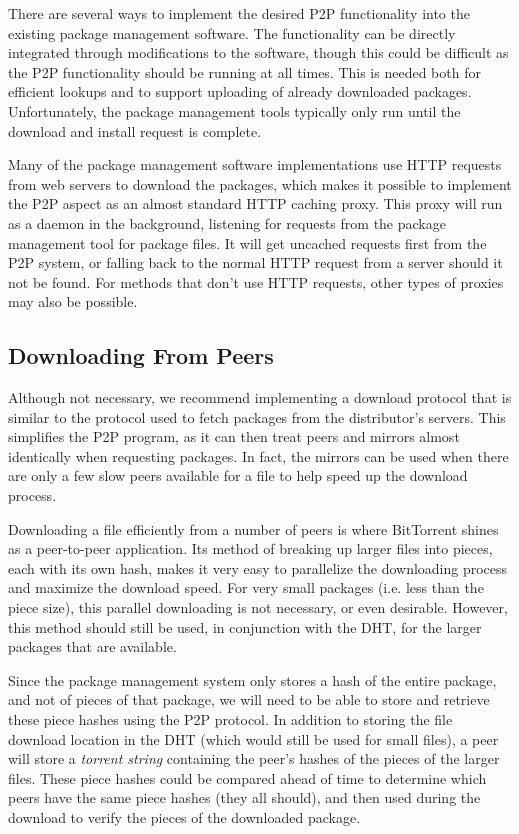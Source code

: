\documentclass[conference]{IEEEtran}
\begin{document}
There are several ways to implement the desired P2P functionality
into the existing package management software. The functionality can
be directly integrated through modifications to the software, though
this could be difficult as the P2P functionality should be running
at all times. This is needed both for efficient lookups and to
support uploading of already downloaded packages. Unfortunately, the
package management tools typically only run until the download and
install request is complete.

Many of the package management software implementations use HTTP
requests from web servers to download the packages, which makes it
possible to implement the P2P aspect as an almost standard HTTP
caching proxy. This proxy will run as a daemon in the background,
listening for requests from the package management tool for package
files. It will get uncached requests first from the P2P system, or
falling back to the normal HTTP request from a server should it not
be found. For methods that don't use HTTP requests, other types of
proxies may also be possible.

\subsection{Downloading From Peers}
\label{downloading}

Although not necessary, we recommend implementing a download
protocol that is similar to the protocol used to fetch packages from
the distributor's servers. This simplifies the P2P program, as it
can then treat peers and mirrors almost identically when requesting
packages. In fact, the mirrors can be used when there are only a few
slow peers available for a file to help speed up the download
process.

Downloading a file efficiently from a number of peers is where
BitTorrent shines as a peer-to-peer application. Its method of
breaking up larger files into pieces, each with its own hash,
makes it very easy to parallelize the downloading process and
maximize the download speed. For very small packages (i.e. less than
the piece size), this parallel downloading is not necessary, or
even desirable. However, this method should still be used, in
conjunction with the DHT, for the larger packages that are
available.

Since the package management system only stores a hash of the entire
package, and not of pieces of that package, we will need to be able
to store and retrieve these piece hashes using the P2P protocol. In
addition to storing the file download location in the DHT (which
would still be used for small files), a peer will store a
\emph{torrent string} containing the peer's hashes of the pieces of
the larger files. These piece hashes could be compared ahead of time
to determine which peers have the same piece hashes (they all
should), and then used during the download to verify the pieces of
the downloaded package.
\end{document}
